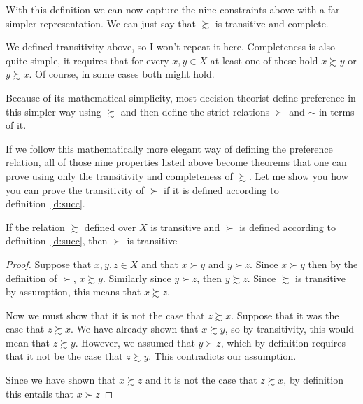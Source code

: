
With this definition we can now capture the nine constraints above with a far simpler representation.  We can just say that $\succsim$ is transitive and complete.  

We defined transitivity above, so I won't repeat it here.  Completeness is also quite simple, it requires that for every $x, y \in X$ at least one of these hold $x \succsim y$ or $y \succsim x$.  Of course, in some cases both might hold.

Because of its mathematical simplicity, most decision theorist define preference in this simpler way using $\succsim$ and then define the strict relations $\succ$ and $\sim$ in terms of it.

 If we follow this mathematically more elegant way of defining the preference relation, all of those nine properties listed above become theorems that one can prove using only the transitivity and completeness of $\succsim$.  Let me show you how you can prove the transitivity of $\succ$ if it is defined according to definition~\ref{d:succ}.

\begin{proposition}
If the relation $\succsim$ defined over $X$ is transitive and $\succ$ is defined according to definition~\ref{d:succ}, then $\succ$ is transitive
\end{proposition}

\begin{proof}
Suppose that $x, y, z \in X$ and that $x \succ y$ and $y \succ z$.  Since $x \succ y$ then by the definition of $\succ$, $x \succsim y$.  Similarly since $y \succ z$, then $y \succsim z$.  Since $\succsim$ is transitive by assumption, this means that $x \succsim z$. 

Now we must show that it is not the case that $z \succsim x$.  Suppose that it was the case that $z \succsim x$. We have already shown that $x \succsim y$, so by transitivity, this would mean that $z \succsim y$.  However, we assumed that $y \succ z$, which by definition requires that it not be the case that $z \succsim y$. This contradicts our assumption.

Since we have shown that $x \succsim z$ and it is not the case that $z \succsim x$, by definition this entails that $x \succ z$
\end{proof}

